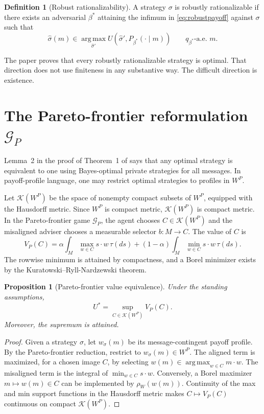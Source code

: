 \documentclass[11pt]{article}
\newtheorem{proposition}[theorem]{Proposition}
\theoremstyle{definition}
\newtheorem{definition}[theorem]{Definition}
\theoremstyle{remark}
\newcommand{\argmax}{\operatorname*{arg\,max}}
\newcommand{\K}{\mathcal{K}}
\begin{document}
\begin{definition}[Robust rationalizability]\label{def:RR}
A strategy $\sigma$ is robustly rationalizable if there exists an adversarial $\beta^*$ attaining the infimum in \eqref{eq:robustpayoff} against $\sigma$ such that
\[
  \hat\sigma(m)\in\argmax_{\hat\sigma'} U(\hat\sigma',P_{\beta^*}(\cdot\mid m))
  \qquad q_{\beta^*}\text{-a.e. }m.
\]
\end{definition}

The paper proves that every robustly rationalizable strategy is optimal. That direction does not use finiteness in any substantive way. The difficult direction is existence.

\section{The Pareto-frontier reformulation $\mathcal G_P$}\label{sec:pareto}

Lemma~2 in the proof of Theorem~1 of \cite{DworczakSmolin2026} says that any optimal strategy is equivalent to one using Bayes-optimal private strategies for all messages. In payoff-profile language, one may restrict optimal strategies to profiles in $W^P$.

Let $\K(W^P)$ be the space of nonempty compact subsets of $W^P$, equipped with the Hausdorff metric. Since $W^P$ is compact metric, $\K(W^P)$ is compact metric. In the Pareto-frontier game $\mathcal G_P$, the agent chooses $C\in\K(W^P)$ and the misaligned adviser chooses a measurable selector $b:M\to C$. The value of $C$ is
\begin{equation}\label{eq:VP}
  V_P(C)
  = \alpha\int_M\max_{w\in C}s\cdot w\,\tau(ds)
    +(1-\alpha)\int_M\min_{w\in C}s\cdot w\,\tau(ds).
\end{equation}
The rowwise minimum is attained by compactness, and a Borel minimizer exists by the Kuratowski--Ryll-Nardzewski theorem.

\begin{proposition}[Pareto-frontier value equivalence]\label{prop:paretoequiv}
Under the standing assumptions,
\[
  U^*=\sup_{C\in\K(W^P)}V_P(C).
\]
Moreover, the supremum is attained.
\end{proposition}

\begin{proof}
Given a strategy $\sigma$, let $w_\sigma(m)$ be its message-contingent payoff profile. By the Pareto-frontier reduction, restrict to $w_\sigma(m)\in W^P$. The aligned term is maximized, for a chosen image $C$, by selecting $w(m)\in\argmax_{w\in C}m\cdot w$. The misaligned term is the integral of $\min_{w\in C}s\cdot w$. Conversely, a Borel maximizer $m\mapsto w(m)\in C$ can be implemented by $\rho_W(w(m))$. Continuity of the max and min support functions in the Hausdorff metric makes $C\mapsto V_P(C)$ continuous on compact $\K(W^P)$.
\end{proof}
\end{document}
